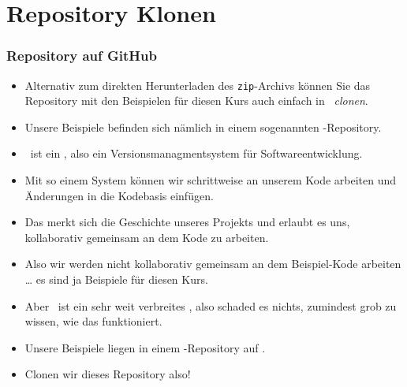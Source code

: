 \documentclass[aspectratio=169,mathserif,notheorems]{beamer}%
\begin{document}
\section{Repository Klonen}%
%
\begin{frame}[t]%
\frametitle{Repository auf GitHub}%
\begin{itemize}%
\item Alternativ zum direkten Herunterladen des \texttt{zip}-Archivs können Sie das Repository mit den Beispielen für diesen Kurs auch einfach in \pycharm\ \emph{clonen}.%
\item<2-> Unsere Beispiele befinden sich nämlich in einem sogenannten \git-Repository.%
\item<3-> \git\ ist ein , also ein Versionsmanagmentsystem für Softwareentwicklung.%
\item<4-> Mit so einem System können wir schrittweise an unserem Kode arbeiten und Änderungen in die Kodebasis einfügen.%
\item<5-> Das  merkt sich die Geschichte unseres Projekts und erlaubt es uns, kollaborativ gemeinsam an dem Kode zu arbeiten.%
\item<6-> Also wir werden nicht kollaborativ gemeinsam an dem Beispiel-Kode arbeiten {\dots} es sind ja Beispiele für diesen Kurs.%
\item<7-> Aber \git\ ist ein sehr weit verbreites , also schaded es nichts, zumindest grob zu wissen, wie das funktioniert.%
\item<8-> Unsere Beispiele liegen in einem \git-Repository auf \github{}.%
\item<9-> Clonen wir dieses Repository also!%
\end{itemize}%
\end{frame}%
%
\end{document}
